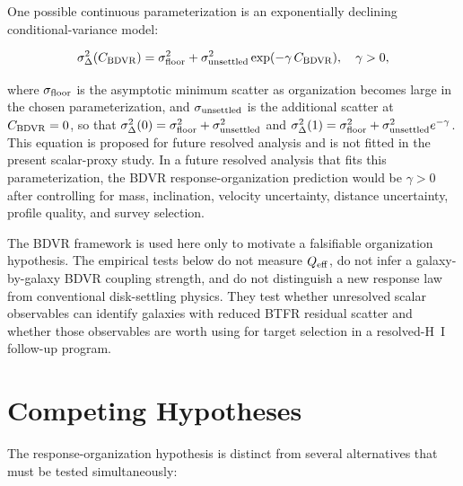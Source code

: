 \documentclass[11pt]{article}
\begin{document}
One possible continuous parameterization is an exponentially declining conditional-variance model:

\begin{equation}
\sigma_{\Delta}^{2}(C_{\rm BDVR}) = \sigma_{\rm floor}^{2} + \sigma_{\rm unsettled}^{2} \exp(-\gamma \, C_{\rm BDVR}), \quad \gamma > 0,
\label{eq:var_model}
\end{equation}

where $\sigma_{\rm floor}$ is the asymptotic minimum scatter as organization becomes large in the chosen parameterization, and $\sigma_{\rm unsettled}$ is the additional scatter at $C_{\rm BDVR}=0$, so that $\sigma_{\Delta}^2(0) = \sigma_{\rm floor}^2 + \sigma_{\rm unsettled}^2$ and $\sigma_{\Delta}^2(1) = \sigma_{\rm floor}^2 + \sigma_{\rm unsettled}^2 e^{-\gamma}$. This equation is proposed for future resolved analysis and is not fitted in the present scalar-proxy study. In a future resolved analysis that fits this parameterization, the BDVR response-organization prediction would be $\gamma > 0$ after controlling for mass, inclination, velocity uncertainty, distance uncertainty, profile quality, and survey selection.

The BDVR framework is used here only to motivate a falsifiable organization hypothesis. The empirical tests below do not measure $Q_{\rm eff}$, do not infer a galaxy-by-galaxy BDVR coupling strength, and do not distinguish a new response law from conventional disk-settling physics. They test whether unresolved scalar observables can identify galaxies with reduced BTFR residual scatter and whether those observables are worth using for target selection in a resolved-H~I follow-up program.

\section{Competing Hypotheses}

The response-organization hypothesis is distinct from several alternatives that must be tested simultaneously:
\end{document}
